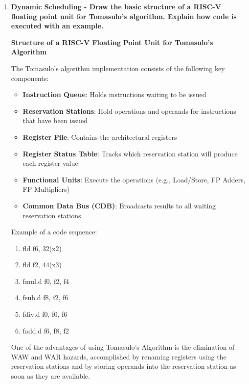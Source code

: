 \begin{enumerate}
    \item \textbf{Dynamic Scheduling - Draw the basic structure of a RISC-V floating point unit for Tomasulo's algorithm. Explain how code is executed with an example.}
    
    
    \begin{center}
        \textbf{Structure of a RISC-V Floating Point Unit for Tomasulo's Algorithm}
        
        The Tomasulo's algorithm implementation consists of the following key components:
        \begin{itemize}
            \item \textbf{Instruction Queue}: Holds instructions waiting to be issued
            \item \textbf{Reservation Stations}: Hold operations and operands for instructions that have been issued
            \item \textbf{Register File}: Contains the architectural registers
            \item \textbf{Register Status Table}: Tracks which reservation station will produce each register value
            \item \textbf{Functional Units}: Execute the operations (e.g., Load/Store, FP Adders, FP Multipliers)
            \item \textbf{Common Data Bus (CDB)}: Broadcasts results to all waiting reservation stations
        \end{itemize}
    \end{center}
    
    Example of a code sequence:
    \begin{enumerate}
        \item fld f6, 32(x2)
        \item fld f2, 44(x3)
        \item fmul.d f0, f2, f4
        \item fsub.d f8, f2, f6
        \item fdiv.d f0, f0, f6
        \item fadd.d f6, f8, f2
    \end{enumerate}
    
    One of the advantages of using Tomasulo's Algorithm is the elimination of WAW and WAR hazards, accomplished by renaming registers using the reservation stations and by storing operands into the reservation station as soon as they are available.


\end{enumerate}
